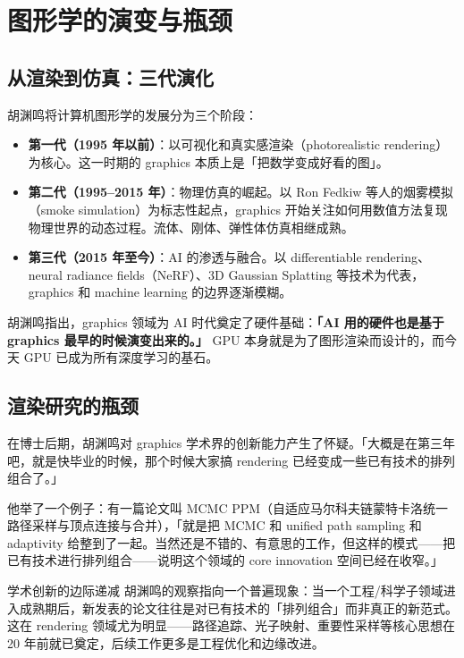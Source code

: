 \documentclass[a4paper]{article}
\begin{document}
\section{图形学的演变与瓶颈}

\subsection{从渲染到仿真：三代演化}

胡渊鸣将计算机图形学的发展分为三个阶段：

\begin{itemize}
    \item \textbf{第一代（1995 年以前）}：以可视化和真实感渲染（photorealistic rendering）为核心。这一时期的 graphics 本质上是「把数学变成好看的图」。
    \item \textbf{第二代（1995--2015 年）}：物理仿真的崛起。以 Ron Fedkiw 等人的烟雾模拟（smoke simulation）为标志性起点，graphics 开始关注如何用数值方法复现物理世界的动态过程。流体、刚体、弹性体仿真相继成熟。
    \item \textbf{第三代（2015 年至今）}：AI 的渗透与融合。以 differentiable rendering、neural radiance fields（NeRF）、3D Gaussian Splatting 等技术为代表，graphics 和 machine learning 的边界逐渐模糊。
\end{itemize}

胡渊鸣指出，graphics 领域为 AI 时代奠定了硬件基础：\textbf{「AI 用的硬件也是基于 graphics 最早的时候演变出来的。」} GPU 本身就是为了图形渲染而设计的，而今天 GPU 已成为所有深度学习的基石。

\subsection{渲染研究的瓶颈}

在博士后期，胡渊鸣对 graphics 学术界的创新能力产生了怀疑。「大概是在第三年吧，就是快毕业的时候，那个时候大家搞 rendering 已经变成一些已有技术的排列组合了。」

他举了一个例子：有一篇论文叫 MCMC PPM（自适应马尔科夫链蒙特卡洛统一路径采样与顶点连接与合并），「就是把 MCMC 和 unified path sampling 和 adaptivity 给整到了一起。当然还是不错的、有意思的工作，但这样的模式——把已有技术进行排列组合——说明这个领域的 core innovation 空间已经在收窄。」

\begin{warningbox}{学术创新的边际递减}
胡渊鸣的观察指向一个普遍现象：当一个工程/科学子领域进入成熟期后，新发表的论文往往是对已有技术的「排列组合」而非真正的新范式。这在 rendering 领域尤为明显——路径追踪、光子映射、重要性采样等核心思想在 20 年前就已奠定，后续工作更多是工程优化和边缘改进。
\end{warningbox}
\end{document}
